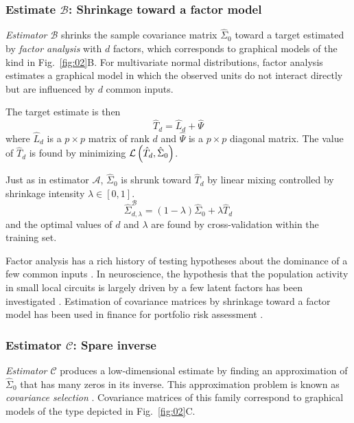 \subsubsection*{Estimate $\mathcal B$: Shrinkage toward a factor model}
\emph{Estimator $\mathcal B$} shrinks the sample covariance matrix $\hat\Sigma_0$ toward a target estimated by \emph{factor analysis} with $d$ factors, which corresponds to graphical models of the kind in Fig.~\ref{fig:02}B. For multivariate normal distributions, factor analysis estimates a graphical model in which the observed units do not interact directly but are influenced by $d$ common inputs.

The target estimate is then 
\begin{equation}
\hat T_d = \hat L_d + \hat \Psi
\end{equation}
where $\hat L_d$ is a $p\times p$ matrix of rank $d$ and $\hat \Psi$ is a $p\times p$ diagonal matrix. The value of $\hat T_d$ is found by minimizing $\mathcal L\left(\hat T_d, \hat\Sigma_0\right)$.

Just as in estimator $\mathcal A$, $\hat\Sigma_0$ is shrunk toward $\hat T_d$ by linear mixing controlled by shrinkage intensity $\lambda\in[0,1]$.
\begin{equation}
\hat\Sigma_{d,\lambda}^\mathcal{B} = (1-\lambda)\hat\Sigma_0 + \lambda\hat T_d
\end{equation}
and the optimal values of $d$ and $\lambda$ are found by cross-validation within the training set.

Factor analysis has a rich history of testing hypotheses about the dominance of a few common inputs \cite{findagoodone}.  In neuroscience, the hypothesis that the population activity in small local circuits is largely driven by a few latent factors has been investigated \cite{Yu:2009,Ecker:2013}.  Estimation of covariance matrices by shrinkage toward a factor model has been used in finance for portfolio risk assessment \cite{Ledoit:2003,Fan:2008}.

\subsubsection*{Estimator $\mathcal C$: Spare inverse}
\emph{Estimator $\mathcal C$} produces a low-dimensional estimate by finding an approximation of $\hat\Sigma_0$ that has many zeros in its inverse. This approximation problem is known as \emph{covariance selection} \cite{Dempster:1972}.  Covariance matrices of this family correspond to graphical models of the type depicted in Fig.~\ref{fig:02}C.

